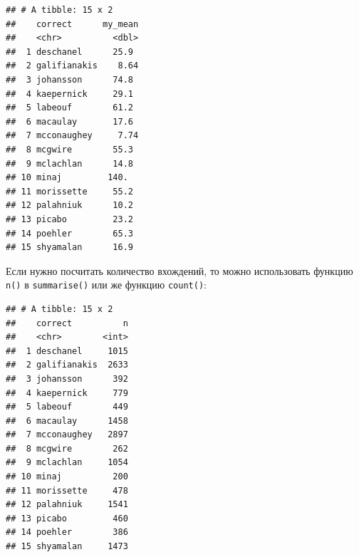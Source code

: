 \documentclass[]{book}
\newenvironment{Shaded}{\begin{snugshade}}{\end{snugshade}}
\newcommand{\DataTypeTok}[1]{\textcolor[rgb]{0.13,0.29,0.53}{#1}}
\newcommand{\KeywordTok}[1]{\textcolor[rgb]{0.13,0.29,0.53}{\textbf{#1}}}
\newcommand{\NormalTok}[1]{#1}
\newcommand{\OperatorTok}[1]{\textcolor[rgb]{0.81,0.36,0.00}{\textbf{#1}}}
\newcommand{\StringTok}[1]{\textcolor[rgb]{0.31,0.60,0.02}{#1}}
\begin{document}
\begin{Shaded}
\end{Shaded}

\begin{verbatim}
## # A tibble: 15 x 2
##    correct      my_mean
##    <chr>          <dbl>
##  1 deschanel      25.9 
##  2 galifianakis    8.64
##  3 johansson      74.8 
##  4 kaepernick     29.1 
##  5 labeouf        61.2 
##  6 macaulay       17.6 
##  7 mcconaughey     7.74
##  8 mcgwire        55.3 
##  9 mclachlan      14.8 
## 10 minaj         140.  
## 11 morissette     55.2 
## 12 palahniuk      10.2 
## 13 picabo         23.2 
## 14 poehler        65.3 
## 15 shyamalan      16.9
\end{verbatim}

Если нужно посчитать количество вхождений, то можно использовать функцию \texttt{n()} в \texttt{summarise()} или же функцию \texttt{count()}:

\begin{Shaded}
\end{Shaded}

\begin{verbatim}
## # A tibble: 15 x 2
##    correct          n
##    <chr>        <int>
##  1 deschanel     1015
##  2 galifianakis  2633
##  3 johansson      392
##  4 kaepernick     779
##  5 labeouf        449
##  6 macaulay      1458
##  7 mcconaughey   2897
##  8 mcgwire        262
##  9 mclachlan     1054
## 10 minaj          200
## 11 morissette     478
## 12 palahniuk     1541
## 13 picabo         460
## 14 poehler        386
## 15 shyamalan     1473
\end{verbatim}

\begin{Shaded}
\end{Shaded}
\end{document}
